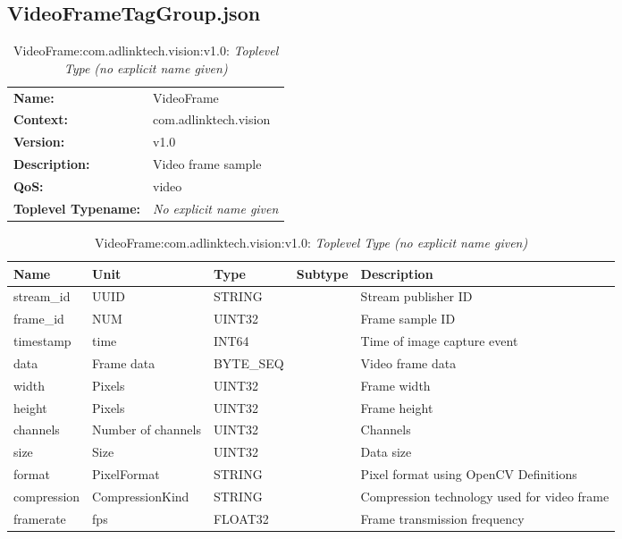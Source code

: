 \subsection{VideoFrameTagGroup.json}

\begin{table}[H]
\begin{tabularx}{\textwidth}{l X} 
       \textbf{Name:} & VideoFrame \\ 
	   \textbf{Context:} & com.adlinktech.vision \\ 
	   \textbf{Version:} & v1.0 \\ 
	   \textbf{Description:} & Video frame sample \\ 
	   \textbf{QoS:} & video \\
	   \textbf{Toplevel Typename:} & \textit{No explicit name given} \\ 
\end{tabularx}
\caption{VideoFrame:com.adlinktech.vision:v1.0}\label{VideoFrameTagGroup.json:table:VideoFrame}
\bigskip
\begin{tabularx}{\textwidth}{l l l l X} 
	 \textbf{Name} & \textbf{Unit} & \textbf{Type} & \textbf{Subtype} & \textbf{Description} \\
	 \midrule
   stream\_id & UUID & STRING &  & Stream publisher ID \\
   frame\_id & NUM & UINT32 &  & Frame sample ID \\
   timestamp & time & INT64 &  & Time of image capture event \\
   data & Frame data & BYTE\_SEQ &  & Video frame data \\
   width & Pixels & UINT32 &  & Frame width \\
   height & Pixels & UINT32 &  & Frame height \\
   channels & Number of channels & UINT32 &  & Channels \\
   size & Size & UINT32 &  & Data size \\
   format & PixelFormat & STRING &  & Pixel format using OpenCV Definitions \\
   compression & CompressionKind & STRING &  & Compression technology used for video frame \\
   framerate & fps & FLOAT32 &  & Frame transmission frequency \\
\end{tabularx}
\caption{VideoFrame:com.adlinktech.vision:v1.0: \textit{Toplevel Type (no explicit name given)}}\label{VideoFrameTagGroup.json:table:VideoFrame-no-type-given}


\end{table}

